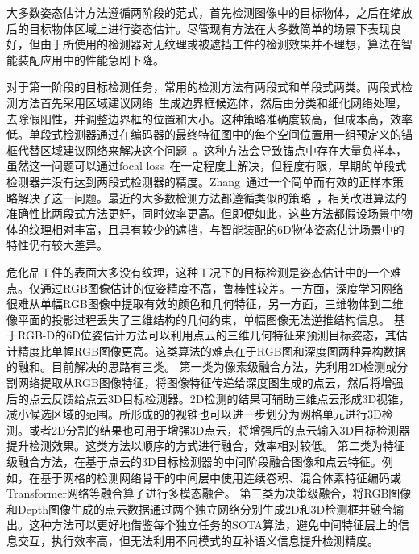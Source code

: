 \documentclass[12pt]{article}
\begin{document}
大多数姿态估计方法遵循两阶段的范式，首先检测图像中的目标物体，之后在缩放后的目标物体区域上进行姿态估计。尽管现有方法在大多数简单的场景下表现良好，但由于所使用的检测器对无纹理或被遮挡工件的检测效果并不理想，算法在智能装配应用中的性能急剧下降。

对于第一阶段的目标检测任务，常用的检测方法有两段式和单段式两类\cite{ATSS, fcosv1, fcosv2, PAA, faster-rcnn, maskrcnn}。两段式检测方法首先采用区域建议网络~\cite{faster-rcnn, maskrcnn}生成边界框候选体，然后由分类和细化网络处理，去除假阳性，并调整边界框的位置和大小。这种策略准确度较高，但成本高，效率低。单段式检测器通过在编码器的最终特征图中的每个空间位置用一组预定义的锚框代替区域建议网络来解决这个问题~\cite{retinanet,fcosv1,yolov1}。这种方法会导致锚点中存在大量负样本，虽然这一问题可以通过focal loss~\cite{retinanet,fpn}在一定程度上解决，但程度有限，早期的单段式检测器并没有达到两段式检测器的精度。Zhang~\cite{ATSS}通过一个简单而有效的正样本策略解决了这一问题。最近的大多数检测方法都遵循类似的策略~\cite{fcosv2, PAA, autoassign, OTA, TTF, yolov3}，相关改进算法的准确性比两段式方法更好，同时效率更高。但即便如此，这些方法都假设场景中物体的纹理相对丰富，且具有较少的遮挡，与智能装配的6D物体姿态估计场景中的特性仍有较大差异。

危化品工件的表面大多没有纹理，这种工况下的目标检测是姿态估计中的一个难点。仅通过RGB图像估计的位姿精度不高，鲁棒性较差。一方面，深度学习网络很难从单幅RGB图像中提取有效的颜色和几何特征，另一方面，三维物体到二维像平面的投影过程丢失了三维结构的几何约束，单幅图像无法逆推结构信息。
基于RGB-D的6D位姿估计方法可以利用点云的三维几何特征来预测目标姿态，其估计精度比单幅RGB图像更高。这类算法的难点在于RGB图和深度图两种异构数据的融和。目前解决的思路有三类。
第一类为像素级融合方法，先利用2D检测或分割网络提取从RGB图像特征，将图像特征传递给深度图生成的点云，然后将增强后的点云反馈给点云3D目标检测器。2D检测的结果可辅助三维点云形成3D视锥\cite{Qi2018}，减小候选区域的范围。所形成的的视锥也可以进一步划分为网格单元\cite{Wang2019}进行3D检测。或者2D分割的结果也可用于增强3D点云\cite{Vora2020}，将增强后的点云输入3D目标检测器提升检测效果。这类方法以顺序的方式进行融合，效率相对较低。
第二类为特征级融合方法，在基于点云的3D目标检测器的中间阶段融合图像和点云特征。例如，在基于网格的检测网络骨干的中间层中使用连续卷积\cite{Liang2018, Liang2019}、混合体素特征编码\cite{Sindagi2019}或Transformer\cite{Zhang2022}网络等融合算子进行多模态融合。
第三类为决策级融合，将RGB图像和Depth图像生成的点云数据通过两个独立网络分别生成2D和3D检测框\cite{Asvadi2018}并融合输出。这种方法可以更好地借鉴每个独立任务的SOTA算法，避免中间特征层上的信息交互，执行效率高，但无法利用不同模式的互补语义信息\cite{Pang2020}提升检测精度。
\end{document}
